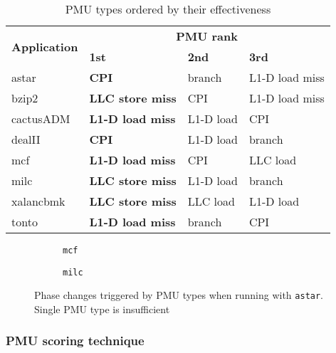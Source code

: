 \documentclass{sig-alternate}
\begin{document}
\begin{table}[bt!]
\begin{footnotesize}
\begin{tabular}{|l|lll|}
\hline
\multirow{2}{*}{{\bf Application}} & \multicolumn{3}{c|}{{\bf PMU rank}}           \\ \cline{2-4} 
                                   & {\bf 1st}    & {\bf 2nd} & {\bf 3rd}    \\ \hline
astar                              & \textbf{CPI}            & branch       & L1-D load miss \\
bzip2                              &\textbf{LLC store miss} & CPI          & L1-D load miss \\
cactusADM                          & \textbf{L1-D load miss} & L1-D load    & CPI            \\
dealII                             & \textbf{CPI}            & L1-D load    & branch         \\
mcf                                & \textbf{L1-D load miss} & CPI          & LLC load       \\
milc                               & \textbf{LLC store miss} & L1-D load    & branch         \\
xalancbmk                          & \textbf{LLC store miss} & LLC load     & L1-D load      \\
tonto                              & \textbf{L1-D load miss} & branch       & CPI            \\ \hline
\end{tabular}
\caption{PMU types ordered by their effectiveness}
\label{table:pmctype}
\end{footnotesize}
\end{table}
\begin{figure*}
\centering
\begin{subfigure}[t]{1\columnwidth}
\centering
{}
\caption{\texttt{mcf}}
\label{fig:mcfl1dastar}
\end{subfigure}
\hfill
\begin{subfigure}[t]{1\columnwidth}
\centering
{}
\caption{\texttt{milc}}
\label{fig:milcl1dastar}
\end{subfigure}
\caption{Phase changes triggered by PMU types when running with \texttt{astar}. Single PMU type is insufficient}
\label{fig:PMUtypephase}
\end{figure*}
\subsubsection{PMU scoring technique}
\label{subsubsec:PMUscoringtechnique}
\end{document}
